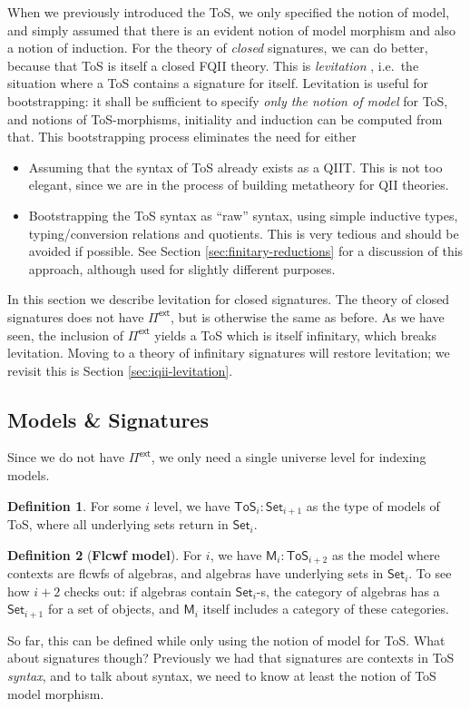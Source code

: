 \documentclass[12pt,a4paper,twoside,openany]{book}
\theoremstyle{remark}
\theoremstyle{definition}
\newtheorem{mydefinition}{Definition}
\theoremstyle{theorem}
\newcommand{\bs}[1]{\boldsymbol{#1}}
\newcommand{\Set}{\mathsf{Set}}
\newcommand{\ToS}{\mathsf{ToS}}
\newcommand{\Pie}{\Pi^{\mathsf{ext}}}
\newcommand{\bM}{\bs{\mathsf{M}}}
\begin{document}
When we previously introduced the ToS, we only specified the notion of model,
and simply assumed that there is an evident notion of model morphism and also a
notion of induction. For the theory of \emph{closed} signatures, we can do
better, because that ToS is itself a closed FQII theory. This is
\emph{levitation} \cite{chapman2010gentle}, i.e.\ the situation where a ToS contains a
signature for itself. Levitation is useful for bootstrapping: it shall be
sufficient to specify \emph{only the notion of model} for ToS, and notions of
ToS-morphisms, initiality and induction can be computed from that. This
bootstrapping process eliminates the need for either
\begin{itemize}
  \item Assuming that the syntax of ToS already exists as a QIIT. This is
        not too elegant, since we are in the process of building metatheory
        for QII theories.
  \item Bootstrapping the ToS syntax as ``raw'' syntax, using simple inductive
        types, typing/conversion relations and quotients. This is very tedious and
        should be avoided if possible. See Section \ref{sec:finitary-reductions} for
        a discussion of this approach, although used for slightly different
        purposes.
\end{itemize}

In this section we describe levitation for closed signatures. The theory of
closed signatures does not have $\Pie$, but is otherwise the same as before.  As
we have seen, the inclusion of $\Pie$ yields a ToS which is itself infinitary,
which breaks levitation. Moving to a theory of infinitary signatures will
restore levitation; we revisit this is Section \ref{sec:iqii-levitation}.

\subsection{Models \& Signatures}

Since we do not have $\Pie$, we only need a single universe level for indexing models.

\begin{mydefinition} For some $i$ level, we have $\ToS_i : \Set_{i+1}$ as the type of
models of ToS, where all underlying sets return in $\Set_i$.
\end{mydefinition}

\begin{mydefinition}[\textbf{Flcwf model}]
For $i$, we have $\bM_{i} : \ToS_{i + 2}$ as the model where contexts are flcwfs
of algebras, and algebras have underlying sets in $\Set_i$. To see how $i + 2$
checks out: if algebras contain $\Set_i$-s, the category of algebras has a
$\Set_{i + 1}$ for a set of objects, and $\bM_{i}$ itself includes a category of
these categories.
\end{mydefinition}
So far, this can be defined while only using the notion of model for ToS. What
about signatures though? Previously we had that signatures are contexts in ToS
\emph{syntax}, and to talk about syntax, we need to know at least the notion of
ToS model morphism.
\end{document}
